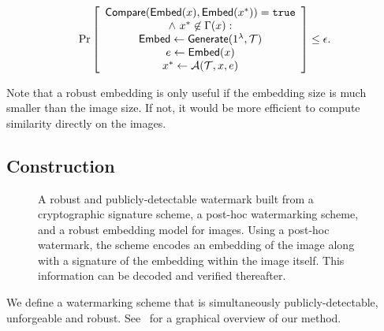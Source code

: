 \documentclass[12pt]{article}
\begin{document}
\begin{align*}
    \Pr\left[
    \begin{array}{ccc}
        \begin{matrix}
            \mathsf{Compare}(\mathsf{Embed}(x), \mathsf{Embed}(x^*)) = \mathtt{true} \\ 
            \land\ x^* \not\in \Gamma(x): \\
            \mathsf{Embed} \gets \mathsf{Generate}(1^\lambda, \mathcal{T}) \\
            e \gets \mathsf{Embed}(x) \\
            x^* \gets \mathcal{A}(\mathcal{T}, x, e) \\
        \end{matrix} \\
    \end{array}
    \right] \leq \epsilon.
\end{align*}

Note that a robust embedding is only useful if the embedding size is much smaller than the image size.
If not, it would be more efficient to compute similarity directly on the images.

\subsection{Construction}

\begin{figure*}[t]
    \centering
    \caption{A robust and publicly-detectable watermark built from a cryptographic signature scheme, a post-hoc watermarking scheme, and a robust embedding model for images. Using a post-hoc watermark, the scheme encodes an embedding of the image along with a signature of the embedding within the image itself. This information can be decoded and verified thereafter.}
    \label{fig:this_work}
\end{figure*}

We define a watermarking scheme that is simultaneously publicly-detectable, unforgeable and robust.
See~ for a graphical overview of our method.
\end{document}
